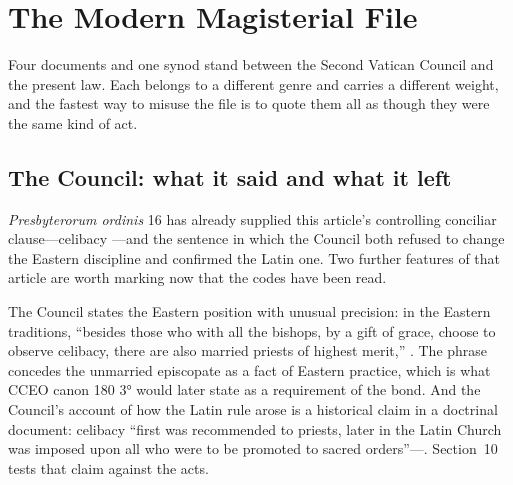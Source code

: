 \section{The Modern Magisterial File}

Four documents and one synod stand between the Second Vatican Council and the present law. Each belongs to a different genre and carries a different weight, and the fastest way to misuse the file is to quote them all as though they were the same kind of act.

\subsection{The Council: what it said and what it left}

\emph{Presbyterorum ordinis} 16 has already supplied this article's controlling conciliar clause---celibacy ---and the sentence in which the Council both refused to change the Eastern discipline and confirmed the Latin one. Two further features of that article are worth marking now that the codes have been read.

The Council states the Eastern position with unusual precision: in the Eastern traditions, ``besides those who with all the bishops, by a gift of grace, choose to observe celibacy, there are also married priests of highest merit,'' . The phrase  concedes the unmarried episcopate as a fact of Eastern practice, which is what CCEO canon 180 3° would later state as a requirement of the bond. And the Council's account of how the Latin rule arose is a historical claim in a doctrinal document: celibacy ``first was recommended to priests, later in the Latin Church was imposed upon all who were to be promoted to sacred orders''---. Section~10 tests that claim against the acts.

